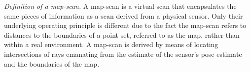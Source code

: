\begin{definition}
  \label{def:definition_3}
  \textit{Definition of a map-scan.}
  A map-scan is a virtual scan that encapsulates the same pieces of information
  as a scan derived from a physical sensor. Only their underlying operating
  principle is different due to the fact the map-scan refers to distances to
  the boundaries of a point-set, referred to as the map, rather than within a
  real environment. A map-scan is derived by means of locating intersections of
  rays emanating from the estimate of the sensor's pose estimate and the
  boundaries of the map.
\end{definition}
